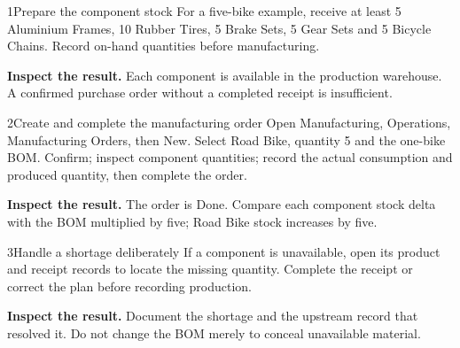 
\begin{labquestion}{1}{Prepare the component stock}
For a five-bike example, receive at least 5 Aluminium Frames, 10 Rubber Tires, 5 Brake Sets, 5 Gear Sets and 5 Bicycle Chains. Record on-hand quantities before manufacturing.
\end{labquestion}
\begin{labanswer}\textbf{Inspect the result.} Each component is available in the production warehouse. A confirmed purchase order without a completed receipt is insufficient.\end{labanswer}

\begin{labquestion}{2}{Create and complete the manufacturing order}
Open Manufacturing, Operations, Manufacturing Orders, then New. Select Road Bike, quantity 5 and the one-bike BOM. Confirm; inspect component quantities; record the actual consumption and produced quantity, then complete the order.
\end{labquestion}
\begin{labanswer}\textbf{Inspect the result.} The order is Done. Compare each component stock delta with the BOM multiplied by five; Road Bike stock increases by five.\end{labanswer}

\begin{labquestion}{3}{Handle a shortage deliberately}
If a component is unavailable, open its product and receipt records to locate the missing quantity. Complete the receipt or correct the plan before recording production.
\end{labquestion}
\begin{labanswer}\textbf{Inspect the result.} Document the shortage and the upstream record that resolved it. Do not change the BOM merely to conceal unavailable material.\end{labanswer}
